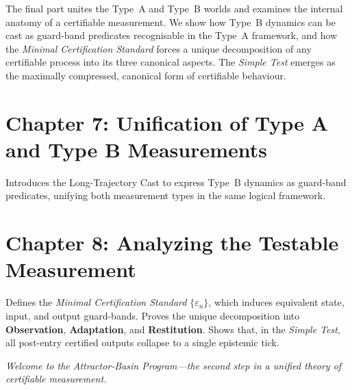 \documentclass[12pt]{article}
\begin{document}
\noindent
The final part unites the Type~A and Type~B worlds and examines the internal anatomy of a certifiable measurement. We show how Type~B dynamics can be cast as guard-band predicates recognisable in the Type~A framework, and how the \emph{Minimal Certification Standard} forces a unique decomposition of any certifiable process into its three canonical aspects. The \emph{Simple Test} emerges as the maximally compressed, canonical form of certifiable behaviour.

\section*{Chapter 7: Unification of Type A and Type B Measurements}
Introduces the Long-Trajectory Cast to express Type~B dynamics as guard-band predicates, unifying both measurement types in the same logical framework.

\section*{Chapter 8: Analyzing the Testable Measurement}
Defines the \emph{Minimal Certification Standard} $\{\varepsilon_n\}$, which induces equivalent state, input, and output guard-bands. Proves the unique decomposition into \textbf{Observation}, \textbf{Adaptation}, and \textbf{Restitution}. Shows that, in the \emph{Simple Test}, all post-entry certified outputs collapse to a single epistemic tick.

\vspace{1em}
\noindent\textit{Welcome to the Attractor-Basin Program---the second step in a unified theory of certifiable measurement.}
\end{document}
